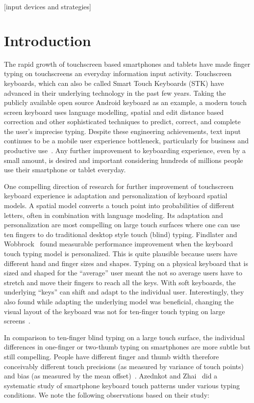 \documentclass{sigchi}
\begin{document}

[input devices and strategies]

\section{Introduction}
The rapid growth of touchscreen based smartphones and tablets have made finger typing on touchscreens an everyday information input activity. Touchscreen keyboards, which can also be called Smart Touch Keyboards (STK) have advanced in their underlying technology in the past few years. Taking the publicly available open source Android keyboard as an example, a modern touch screen keyboard uses language modelling, spatial and edit distance based correction and other sophisticated techniques to predict, correct, and complete the user’s imprecise typing. Despite these engineering achievements, text input continues to be a mobile user experience bottleneck, particularly for business and productive use~\cite{Bao:2011}. Any further improvement to keyboarding experience, even by a small amount, is desired and important considering hundreds of millions people use their smartphone or tablet everyday.

One compelling direction of research for further improvement of touchscreen keyboard experience is adaptation and personalization of keyboard spatial models. A spatial model converts a touch point into probabilities of different letters, often in combination with language  modeling. Its adaptation and personalization
are most compelling on large touch surfaces where one can use ten fingers to do traditional desktop style touch (blind) typing. Findlater and Wobbrock~\cite{Findlater:2012} found measurable performance improvement when the keyboard touch typing model is personalized. This is quite plausible because users have different hand and finger sizes and shapes. Typing on a physical keyboard that is sized and shaped for the “average” user meant the not so average users have to stretch and move their fingers to reach all the keys. With soft keyboards, the underlying “keys” can shift and adapt to the individual user. Interestingly, they also found while adapting the underlying model was beneficial, changing the visual layout of the keyboard was not for ten-finger touch typing on large screens~\cite{Findlater:2012}.

In comparison to ten-finger blind typing on a large touch surface, the individual differences in one-finger or two-thumb typing on smartphones are more subtle but still compelling. People have different finger and thumb width therefore conceivably different touch precisions (as measured by variance of touch points) and bias (as measured by the mean offset)~\cite{Holz:2011}. Azednkot and Zhai~\cite{Azenkot:2012} did a systematic study of smartphone keyboard touch patterns under various typing conditions. We note the following observations based on their study:
\end{document}
